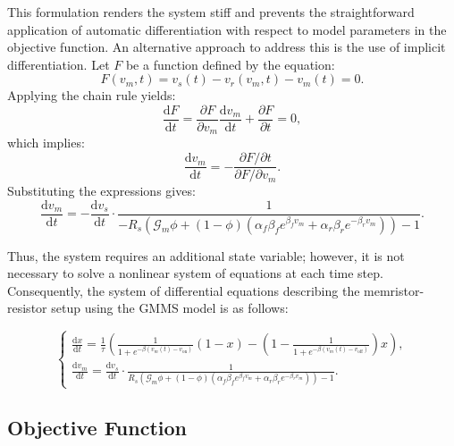\documentclass[11pt, oneside]{article}
\newcommand{\G}{\mathcal{G}}
\begin{document}
This formulation renders the system stiff and prevents the straightforward application of automatic differentiation with respect to model parameters in the objective function. An alternative approach to address this is the use of implicit differentiation.
Let $F$ be a function defined by the equation:
\begin{equation}
    F(v_m, t) = v_s(t) - v_r(v_m, t) - v_m(t) = 0.
\end{equation}
Applying the chain rule yields:
\begin{equation}
    \frac{\mathrm{d} F}{\mathrm{d} t} = \frac{\partial F}{\partial v_m} \frac{\mathrm{d} v_m}{\mathrm{d} t} + \frac{\partial F}{\partial t} = 0,
\end{equation}
which implies:
\begin{equation}
    \frac{\mathrm{d} v_m}{\mathrm{d} t} = - \frac{\partial F / \partial t}{\partial F / \partial v_m}.
\end{equation}
Substituting the expressions gives:
\begin{equation}
    \frac{\mathrm{d} v_m}{\mathrm{d} t} = - \frac{\mathrm{d} v_s}{\mathrm{d} t} \cdot \frac{1}{ - R_s \left( \G_{m} \phi + (1 - \phi) \left( \alpha_f \beta_f e^{\beta_f v_m} + \alpha_r \beta_r e^{-\beta_r v_m} \right) \right) - 1 }.
\end{equation}

Thus, the system requires an additional state variable; however, it is not necessary to solve a nonlinear system of equations at each time step. Consequently, the system of differential equations describing the memristor-resistor setup using the GMMS model is as follows:

\begin{equation}
    \begin{cases}
        \displaystyle \frac{\mathrm{d} x}{\mathrm{d} t} = \frac{1}{\tau} \left( \frac{1}{1 + e^{-\beta \left(v_m(t) - v_{\mathrm{on}}\right)}} (1 - x) - \left( 1 - \frac{1}{1 + e^{-\beta \left(v_m(t) - v_{\mathrm{off}}\right)}} \right) x \right), \\
        \displaystyle \frac{\mathrm{d} v_m}{\mathrm{d} t} = \frac{\mathrm{d} v_s}{\mathrm{d} t} \cdot \frac{1}{R_s \left( \G_{m} \phi + (1 - \phi) \left( \alpha_f \beta_f e^{\beta_f v_m} + \alpha_r \beta_r e^{-\beta_r v_m} \right) \right) - 1}.
    \end{cases}
\end{equation}




\subsection{Objective Function}
\end{document}
